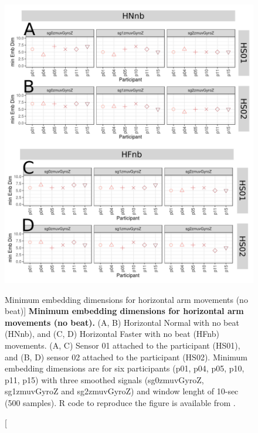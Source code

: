 \begin{figure}
\centering
\includegraphics[width=1.0\textwidth]{cao_Hnb_w10}
	\caption
	[Minimum embedding dimensions for horizontal arm movements 
	(no beat)]{
	{\bf Minimum embedding dimensions for horizontal arm movements 
	(no beat).} 
		(A, B) Horizontal Normal with no beat (HNnb), and 
		(C, D) Horizontal Faster with no beat (HFnb) movements.
		(A, C) Sensor 01 attached to the participant (HS01), and
		(B, D) sensor 02 attached to the participant (HS02).
		Minimum embedding dimensions are for six participants 
		(p01, p04, p05, p10, p11, p15) with three smoothed signals 
		(sg0zmuvGyroZ, sg1zmuvGyroZ and sg2zmuvGyroZ)
		and window lenght of 10-sec (500 samples).
		R code to reproduce the figure is available 
		from \cite{xochicale2018}.
        }
    \label{fig:caoHnb}
\end{figure}
